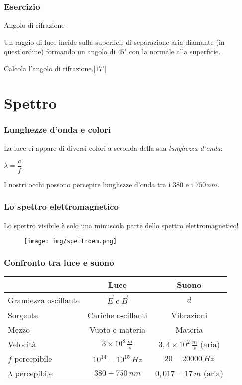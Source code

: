 \documentclass[]{beamer}
\theoremstyle{plain}
\begin{document}
\begin{frame}
\frametitle{Esercizio}
\begin{exampleblock}{Angolo di rifrazione}
{\small Un raggio di luce incide sulla superficie di separazione aria-diamante (in quest'ordine) formando un angolo di $ 45^\circ $ con la normale alla superficie.

Calcola l'angolo di rifrazione.\hspace*{\fill}[$ 17^\circ $]}
\end{exampleblock}
\end{frame}

\section{Spettro}

\begin{frame}
\frametitle{Lunghezze d'onda e colori}
La luce ci appare di diversi colori a seconda della sua \emph{lunghezza d'onda}:
\begin{center}
$ \lambda = \dfrac{c}{f} $
\end{center}\pause
I nostri occhi possono percepire lunghezze d'onda tra i $ 380 $ e i $ 750 \, nm $.
\end{frame}


\begin{frame}
\frametitle{Lo spettro elettromagnetico}
Lo spettro visibile è solo una minuscola parte dello spettro elettromagnetico!
  \begin{figure}
  \texttt{[image: img/spettroem.png]}
  \end{figure}
\end{frame}






\begin{frame}
\frametitle{Confronto tra luce e suono}


\centering
  \begin{tabular}{l|c|c}
    & \textbf{Luce} & \textbf{Suono} \\\hline\rule{0pt}{3ex}
    Grandezza oscillante & $ \vec{E} $ e $ \vec{B} $ & $ d $ \\\rule{0pt}{3ex}
    Sorgente & Cariche oscillanti & Vibrazioni \\\rule{0pt}{3ex}
    Mezzo & Vuoto e materia & Materia \\\rule{0pt}{3ex}
    Velocità & $ 3 \times 10^8 \,\frac{m}{s} $ & $ 3,4 \times 10^2 \, \frac{m}{s} $ (aria)\\\rule{0pt}{3ex}
    $ f $ percepibile & $ 10^{14} - 10^{15}\, Hz $ & $ 20 - 20000 \, Hz $ \\\rule{0pt}{3ex}
    $ \lambda $ percepibile & $ 380-750 \, nm $ & $ 0,017 - 17 \, m $ (aria)\\
  \end{tabular}
\end{frame}
\end{document}

